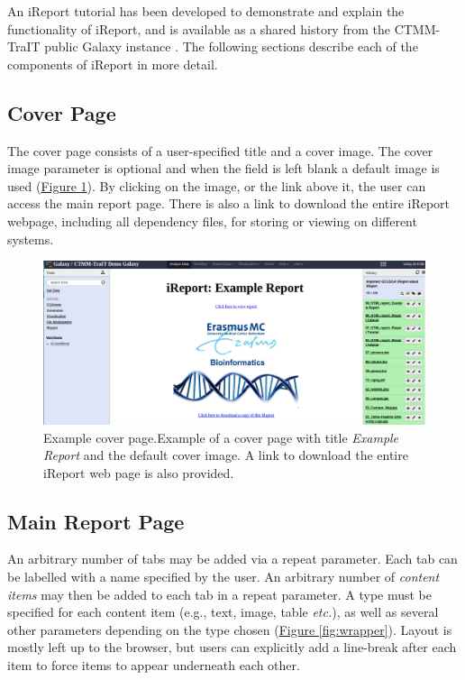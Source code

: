 An iReport tutorial has been developed to demonstrate and explain the functionality of iReport, and is available as a shared history from the CTMM-TraIT public Galaxy instance \cite{url-ireport-tutorial}. The following sections describe each of the components of iReport in more detail.

\subsection*{Cover Page}
The cover page consists of a user-specified title and a cover image. The cover image parameter is optional and when the field is left blank a default image is used (\hyperref[fig:defaultcover]{Figure \ref*{fig:defaultcover}}).
By clicking on the image, or the link above it, the user can access the main report page. There is also a link to download the entire iReport webpage, including all dependency files, for storing or viewing on different systems.

\begin{figure}[h!]
    \includegraphics[width=\textwidth]{chapters/images/iReport/Hiltemann_defaultcover.jpg}
    \caption{Example cover page.Example of a cover page with title \emph{Example Report} and the default cover image. A link to download the entire iReport web page is also provided.}
    \label{fig:defaultcover}
\end{figure}


\subsection*{Main Report Page}
An arbitrary number of tabs may be added via a repeat parameter. Each tab can be labelled with a name specified by the user. An arbitrary number of \emph{content items} may then be added to each tab in a repeat parameter. A type must be specified for each content item (e.g., text, image, table \emph{etc.}), as well as several other parameters depending on the type chosen (\hyperref[fig:wrapper]{Figure \ref*{fig:wrapper}}). Layout is mostly left up to the browser, but users can explicitly add a line-break after each item to force items to appear underneath each other.

